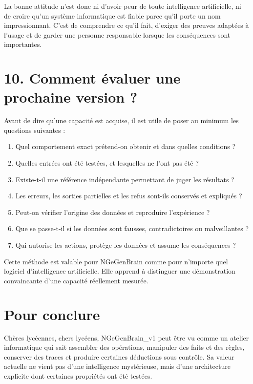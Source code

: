 \documentclass[11pt,a4paper]{article}
\begin{document}
La bonne attitude n'est donc ni d'avoir peur de toute intelligence artificielle, ni de croire qu'un système informatique est fiable parce qu'il porte un nom impressionnant. C'est de comprendre ce qu'il fait, d'exiger des preuves adaptées à l'usage et de garder une personne responsable lorsque les conséquences sont importantes.

\section*{10. Comment évaluer une prochaine version ?}

Avant de dire qu'une capacité est acquise, il est utile de poser au minimum les questions suivantes :
\begin{enumerate}
  \item Quel comportement exact prétend-on obtenir et dans quelles conditions ?
  \item Quelles entrées ont été testées, et lesquelles ne l'ont pas été ?
  \item Existe-t-il une référence indépendante permettant de juger les résultats ?
  \item Les erreurs, les sorties partielles et les refus sont-ils conservés et expliqués ?
  \item Peut-on vérifier l'origine des données et reproduire l'expérience ?
  \item Que se passe-t-il si les données sont fausses, contradictoires ou malveillantes ?
  \item Qui autorise les actions, protège les données et assume les conséquences ?
\end{enumerate}

Cette méthode est valable pour NGeGenBrain comme pour n'importe quel logiciel d'intelligence artificielle. Elle apprend à distinguer une démonstration convaincante d'une capacité réellement mesurée.

\section*{Pour conclure}

Chères lycéennes, chers lycéens, NGeGenBrain\_v1 peut être vu comme un atelier informatique qui sait assembler des opérations, manipuler des faits et des règles, conserver des traces et produire certaines déductions sous contrôle. Sa valeur actuelle ne vient pas d'une intelligence mystérieuse, mais d'une architecture explicite dont certaines propriétés ont été testées.
\end{document}
